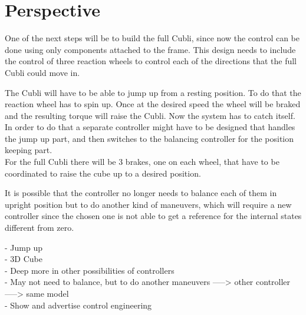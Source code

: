 \chapter{Perspective}

One of the next steps will be to build the full Cubli, since now the control can be done using only components attached to the frame. This design needs to include the control of three reaction wheels to control each of the directions that the full Cubli could move in.

The Cubli will have to be able to jump up from a resting position. To do that the reaction wheel has to spin up. Once at the desired speed the wheel will be braked and the resulting torque will raise the Cubli. Now the system has to catch itself. In order to do that a separate controller might have to be designed that handles the jump up part, and then switches to the balancing controller for the position keeping part.\\
For the full Cubli there will be 3 brakes, one on each wheel, that have to be coordinated to raise the cube up to a desired position.

It is possible that the controller no longer needs to balance each of them in upright position but to do another kind of maneuvers, which will require a new controller since the chosen one is not able to get a reference for the internal states different from zero.


- Jump up\\
- 3D Cube\\
- Deep more in other possibilities of controllers\\
- May not need to balance, but to do another maneuvers -----> other controller -----> same model\\
- Show and advertise control engineering \\